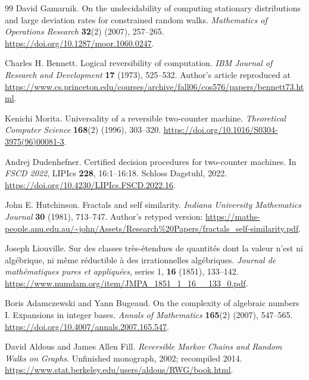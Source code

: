 \documentclass[11pt,letterpaper]{article}
\numberwithin{equation}{section}
\theoremstyle{definition}
\theoremstyle{remark}
\begin{document}
\begin{thebibliography}{99}
David Gamarnik.
On the undecidability of computing stationary distributions and large
deviation rates for constrained random walks.
\emph{Mathematics of Operations Research} \textbf{32}(2) (2007), 257--265.
\url{https://doi.org/10.1287/moor.1060.0247}.

Charles H. Bennett.
Logical reversibility of computation.
\emph{IBM Journal of Research and Development} \textbf{17} (1973), 525--532.
Author's article reproduced at
\url{https://www.cs.princeton.edu/courses/archive/fall06/cos576/papers/bennett73.html}.

Kenichi Morita.
Universality of a reversible two-counter machine.
\emph{Theoretical Computer Science} \textbf{168}(2) (1996), 303--320.
\url{https://doi.org/10.1016/S0304-3975(96)00081-3}.

Andrej Dudenhefner.
Certified decision procedures for two-counter machines.
In \emph{FSCD 2022}, LIPIcs \textbf{228}, 16:1--16:18.
Schloss Dagstuhl, 2022.
\url{https://doi.org/10.4230/LIPIcs.FSCD.2022.16}.

John E. Hutchinson.
Fractals and self similarity.
\emph{Indiana University Mathematics Journal} \textbf{30} (1981), 713--747.
Author's retyped version:
\url{https://maths-people.anu.edu.au/~john/Assets/Research%20Papers/fractals_self-similarity.pdf}.

Joseph Liouville.
Sur des classes tr\`es-\'etendues de quantit\'es dont la valeur n'est ni
alg\'ebrique, ni m\^eme r\'eductible \`a des irrationnelles alg\'ebriques.
\emph{Journal de math\'ematiques pures et appliqu\'ees}, series 1,
\textbf{16} (1851), 133--142.
\url{https://www.numdam.org/item/JMPA_1851_1_16__133_0.pdf}.

Boris Adamczewski and Yann Bugeaud.
On the complexity of algebraic numbers I. Expansions in integer bases.
\emph{Annals of Mathematics} \textbf{165}(2) (2007), 547--565.
\url{https://doi.org/10.4007/annals.2007.165.547}.

David Aldous and James Allen Fill.
\emph{Reversible Markov Chains and Random Walks on Graphs}.
Unfinished monograph, 2002; recompiled 2014.
\url{https://www.stat.berkeley.edu/users/aldous/RWG/book.html}.
\end{thebibliography}
\end{document}
